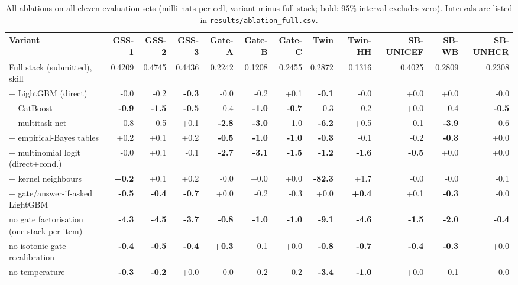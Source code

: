 \begin{table}[t]
\centering
\tiny
\setlength{\tabcolsep}{3pt}
\caption{All ablations on all eleven evaluation sets (milli-nats per cell, variant minus full stack; bold: 95\% interval excludes zero). Intervals are listed in \texttt{results/ablation\_full.csv}.}
\label{tab:ablation-all}
\begin{tabular}{lrrrrrrrrrrr}
\toprule
Variant & GSS-1 & GSS-2 & GSS-3 & Gate-A & Gate-B & Gate-C & Twin & Twin-HH & SB-UNICEF & SB-WB & SB-UNHCR \\
\midrule
Full stack (submitted), skill & 0.4209 & 0.4745 & 0.4436 & 0.2242 & 0.1208 & 0.2455 & 0.2872 & 0.1316 & 0.4025 & 0.2809 & 0.2308 \\
\midrule
$-$ LightGBM (direct) & -0.0 & -0.2 & \textbf{-0.3} & -0.0 & -0.2 & +0.1 & \textbf{-0.1} & -0.0 & +0.0 & +0.0 & -0.0 \\
$-$ CatBoost & \textbf{-0.9} & \textbf{-1.5} & \textbf{-0.5} & -0.4 & \textbf{-1.0} & \textbf{-0.7} & -0.3 & -0.2 & +0.0 & -0.4 & \textbf{-0.5} \\
$-$ multitask net & -0.8 & -0.5 & +0.1 & \textbf{-2.8} & \textbf{-3.0} & -1.0 & \textbf{-6.2} & +0.5 & -0.1 & \textbf{-3.9} & -0.6 \\
$-$ empirical-Bayes tables & +0.2 & +0.1 & +0.2 & \textbf{-0.5} & \textbf{-1.0} & \textbf{-1.0} & \textbf{-0.3} & -0.1 & -0.2 & \textbf{-0.3} & +0.0 \\
$-$ multinomial logit (direct+cond.) & -0.0 & +0.1 & -0.1 & \textbf{-2.7} & \textbf{-3.1} & \textbf{-1.5} & \textbf{-1.2} & \textbf{-1.6} & \textbf{-0.5} & +0.0 & +0.0 \\
$-$ kernel neighbours & \textbf{+0.2} & +0.1 & +0.2 & -0.0 & +0.0 & +0.0 & \textbf{-82.3} & +1.7 & -0.0 & -0.0 & -0.1 \\
$-$ gate/answer-if-asked LightGBM & \textbf{-0.5} & \textbf{-0.4} & \textbf{-0.7} & +0.0 & -0.2 & -0.3 & +0.0 & \textbf{+0.4} & +0.1 & \textbf{-0.3} & -0.0 \\
no gate factorisation (one stack per item) & \textbf{-4.3} & \textbf{-4.5} & \textbf{-3.7} & \textbf{-0.8} & \textbf{-1.0} & \textbf{-1.0} & \textbf{-9.1} & \textbf{-4.6} & \textbf{-1.5} & \textbf{-2.0} & \textbf{-0.4} \\
no isotonic gate recalibration & \textbf{-0.4} & \textbf{-0.5} & \textbf{-0.4} & \textbf{+0.3} & -0.1 & +0.0 & \textbf{-0.8} & \textbf{-0.7} & \textbf{-0.4} & \textbf{-0.3} & +0.0 \\
no temperature & \textbf{-0.3} & \textbf{-0.2} & +0.0 & -0.0 & -0.2 & -0.2 & \textbf{-3.4} & \textbf{-1.0} & +0.0 & -0.1 & -0.0 \\

\end{tabular}
\end{table}
